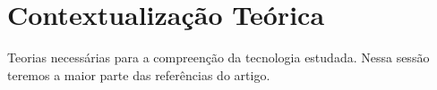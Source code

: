 \section{Contextualização Teórica}\label{sec:the}
Teorias necessárias para a compreenção da tecnologia estudada. Nessa sessão teremos a maior parte das referências do artigo.